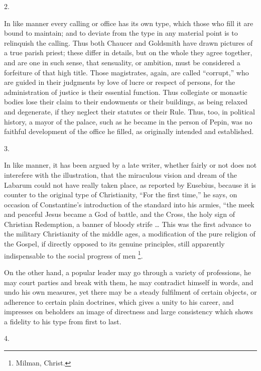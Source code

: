 2.

In like manner every calling or office has its own
type, which those who fill it are bound to maintain; and
to deviate from the type in any material point is to
relinquish the calling. Thus both Chaucer and Goldsmith
have drawn pictures of a true parish priest; these differ
in details, but on the whole they agree together, and are
one in such sense, that sensuality, or ambition, must be
considered a forfeiture of that high title. Those
magistrates, again, are called ``corrupt,'' who
are guided in their judgments by love of lucre or respect
of persons, for the administration of justice is their
essential function. Thus collegiate or monastic bodies
lose their claim to their endowments or their buildings,
as being relaxed and degenerate, if they neglect their
statutes or their Rule. Thus, too, in political history,
a mayor of the palace, such as he became in the person of
Pepin, was no faithful development of the office he
filled, as originally intended and established.

3.

In like manner, it has been argued by a late writer,
whether fairly or not does not interefere with the
illustration, that the miraculous vision and dream of the
Labarum could not have really taken place, as reported by
Eusebius, because it is counter to the original type of
Christianity, ``For the first time,'' he says, on
occasion of Constantine's introduction of the standard
into his armies, ``the meek and peaceful Jesus became
a God of battle, and the Cross, the holy sign of
Christian Redemption, a banner of bloody strife …
This was the first advance to the military Christianity
of the middle ages, a modification of the pure religion
of the Gospel, if directly opposed to its genuine
principles, still apparently indispensable to the social
progress of men \footnote{Milman, Christ.}.

On the other hand, a popular leader may go through a
variety of professions, he may court parties and break
with them, he may contradict himself in words, and undo
his own measures, yet there may be a steady fulfilment of
certain objects, or adherence to certain plain doctrines,
which gives a unity to his career, and impresses on
beholders an image of directness and large consistency
which shows a fidelity to his type from first to last.

4.

